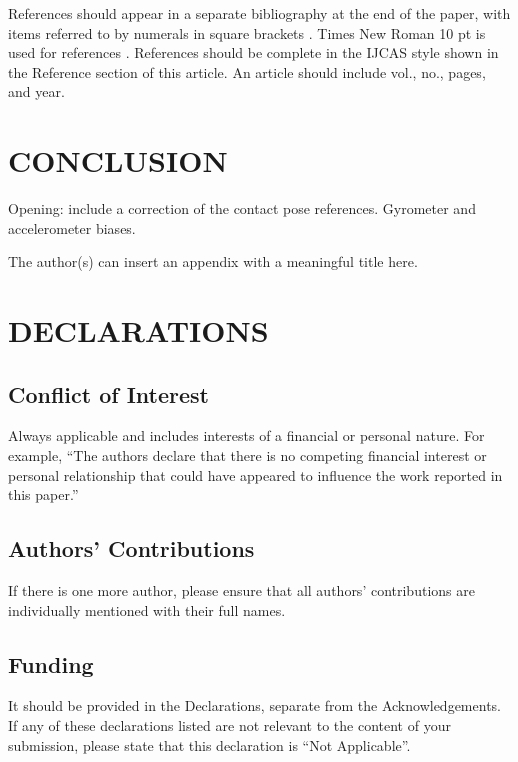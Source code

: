 \documentclass{IJCAS}
\begin{document}
References should appear in a separate bibliography at the end of the paper, with items referred to by numerals in square brackets \cite{1,3,4,5}. Times New Roman 10 pt is used for references \cite{2}. References should be complete in the IJCAS style shown in the Reference section of this article. An article should include vol., no., pages, and year.



\section{CONCLUSION}

Opening: include a correction of the contact pose references.  Gyrometer and accelerometer biases.



\appendix

The author(s) can insert an appendix with a meaningful title here.



\section*{DECLARATIONS}

\subsection*{Conflict of Interest}
Always applicable and includes interests of a financial or personal nature. For example, ``The authors declare that there is no competing financial interest or personal relationship that could have appeared to influence the work reported in this paper.''

\subsection*{Authors' Contributions}
If there is one more author, please ensure that all authors' contributions are individually mentioned with their full names.

\subsection*{Funding }
It should be provided in the Declarations, separate from the Acknowledgements. If any of these declarations listed are not relevant to the content of your submission, please state that this declaration is ``Not Applicable''.




\end{document}
